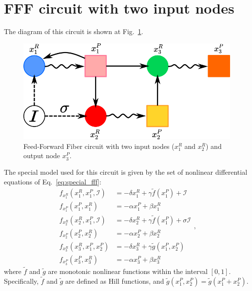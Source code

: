 \section{FFF circuit with two input nodes}
\label{sec:fff}

The diagram of this circuit is shown at Fig.~\ref{fig:twoinput_fff}.

\begin{figure}[H]
    \centering
    \includegraphics[scale=0.7]{figs/broken_n1_1.png}
    \caption{Feed-Forward Fiber circuit with two input nodes 
    ($x_1^R$ and $x_2^R$) and output node $x_3^P$.}
    \label{fig:twoinput_fff}
\end{figure}

The special model \cite{stochs_gene_2005,homeostasis_antonelli2018} used for this circuit is given by the set 
of nonlinear differential equations of Eq.~\ref{eq:special_fff}:
\begin{equation} \label{eq:special_fff}
    \begin{aligned} 
        f_{x_1^R}(x_1^R, x_1^P, \mathcal{I}) &= -\delta x_1^R + \gamma\tilde{f}(x_1^P) + \mathcal{I}\\ 
        f_{x_1^P}(x_1^P, x_1^R) &= -\alpha x_1^P + \beta x_1^R \\ 
        f_{x_2^R}(x_2^R, x_1^P, \mathcal{I}) &= -\delta x_2^R + \gamma\tilde{f}(x_1^P) + \sigma \mathcal{I} \\
        f_{x_2^P}(x_2^P, x_2^R) &= -\alpha x_2^P + \beta x_2^R   \\
        f_{x_3^R}(x_3^R, x_1^P, x_2^P) &= -\delta x_3^R + \gamma \tilde{g}(x_1^P,x_2^P) \\
        f_{x_3^P}(x_3^P, x_3^R) &= -\alpha x_3^P + \beta x_3^R
    \end{aligned},
\end{equation}
where $\tilde{f}$ and $\tilde{g}$ are monotonic nonlinear functions within the interval $[0,1]$. 
Specifically, $\tilde{f}$ and $\tilde{g}$ are defined as Hill functions,
and $\tilde{g}(x_1^P, x_2^P) = \tilde{g}(x_1^P + x_2^P)$.


